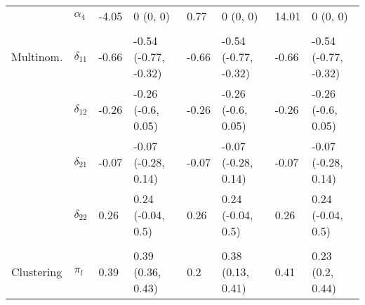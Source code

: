 \documentclass[]{article}
\begin{document}
\begin{table}[t]
\begin{tabular}{llllllll}
\hspace{1em} & $\alpha_{4}$ & -4.05 & 0 (0, 0) & 0.77 & 0 (0, 0) & 14.01 & 0 (0, 0)\\
\addlinespace[0.3em]
\multicolumn{8}{l}{\textbf{ }}\\
\hspace{1em}Multinom. & $\delta_{11}$ & -0.66 & -0.54 (-0.77, -0.32) & -0.66 & -0.54 (-0.77, -0.32) & -0.66 & -0.54 (-0.77, -0.32)\\
\hspace{1em} & $\delta_{12}$ & -0.26 & -0.26 (-0.6, 0.05) & -0.26 & -0.26 (-0.6, 0.05) & -0.26 & -0.26 (-0.6, 0.05)\\
\hspace{1em} & $\delta_{21}$ & -0.07 & -0.07 (-0.28, 0.14) & -0.07 & -0.07 (-0.28, 0.14) & -0.07 & -0.07 (-0.28, 0.14)\\
\hspace{1em} & $\delta_{22}$ & 0.26 & 0.24 (-0.04, 0.5) & 0.26 & 0.24 (-0.04, 0.5) & 0.26 & 0.24 (-0.04, 0.5)\\
\addlinespace[0.3em]
\multicolumn{8}{l}{\textbf{ }}\\
\hspace{1em}Clustering & $\pi_l$ & 0.39 & 0.39 (0.36, 0.43) & 0.2 & 0.38 (0.13, 0.41) & 0.41 & 0.23 (0.2, 0.44)\\
\bottomrule
\end{tabular}
\end{table}
\end{document}
